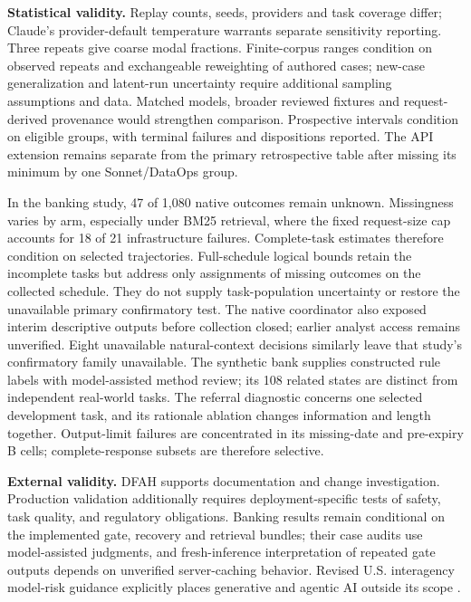 \documentclass{article}
\begin{document}
\textbf{Statistical validity.} Replay counts, seeds, providers and task coverage
differ; Claude's provider-default temperature warrants separate sensitivity
reporting. Three repeats give coarse modal fractions. Finite-corpus ranges
condition on observed repeats and exchangeable reweighting of authored cases;
new-case generalization and latent-run uncertainty require additional sampling
assumptions and data. Matched models, broader reviewed fixtures and
request-derived provenance would strengthen comparison. Prospective intervals
condition on eligible groups, with terminal failures and dispositions reported.
The API extension remains separate from the primary retrospective table after
missing its minimum by one Sonnet/DataOps group.

In the banking study, 47 of 1,080 native outcomes remain unknown. Missingness
varies by arm, especially under BM25 retrieval, where the fixed request-size
cap accounts for 18 of 21 infrastructure failures. Complete-task estimates
therefore condition on selected trajectories. Full-schedule logical bounds
retain the incomplete tasks but address only assignments of missing outcomes
on the collected schedule. They do not supply task-population uncertainty or
restore the unavailable primary confirmatory test. The native coordinator
also exposed interim descriptive outputs before collection closed; earlier
analyst access remains unverified.
Eight unavailable natural-context decisions similarly leave that study's
confirmatory family unavailable. The synthetic bank supplies constructed
rule labels with model-assisted method review; its 108 related states are
distinct from independent real-world tasks. The referral diagnostic concerns
one selected development task, and its rationale ablation changes information
and length together. Output-limit failures are concentrated in its missing-date
and pre-expiry B cells; complete-response subsets are therefore selective.

\textbf{External validity.}  DFAH supports documentation and change
investigation. Production validation additionally requires deployment-specific
tests of safety, task quality, and regulatory obligations. Banking results
remain conditional on the implemented gate, recovery and retrieval bundles;
their case audits use model-assisted judgments,
and fresh-inference interpretation of repeated gate outputs depends on
unverified server-caching behavior. Revised U.S. interagency model-risk
guidance explicitly places generative and agentic AI outside its scope
\citep{federalreserve2026sr262}.
\end{document}
